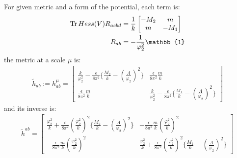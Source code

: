 For given metric and a form of the potential, each term is:
\begin{align}
    \Tr Hess(V) R_{acbd} &= \frac{1}{k} 
    \begin{bmatrix}
        -M_{2} & m \\
        m & -M_{1}
    \end{bmatrix} \\
    R_{ab} &= -\frac{1}{\varphi_{2} ^{2}} \mathbb{1}
\end{align}
the metric at a scale $\mu$ is:
\begin{align}
    \tilde h_{ab} := h_{ab} ^{\mu} = 
    \begin{bmatrix}
        \frac{k}{\varphi _{2} ^{2}} - \frac{\epsilon}{8\pi^{2}} \lbrace \frac{M_{2}}{k} - (\frac{\Lambda}{\varphi_{2}})^{2} \rbrace & \frac{\epsilon}{8\pi^{2}} \frac{m}{k} \\
        \frac{\epsilon}{8\pi^{2}} \frac{m}{k} & \frac{k}{\varphi _{2} ^{2}} - \frac{\epsilon}{8\pi^{2}} \lbrace \frac{M_{1}}{k} - (\frac{\Lambda}{\varphi_{2}})^{2} \rbrace
    \end{bmatrix}
\end{align}
and its inverse is:
\begin{align}
    \tilde h^{ab} = 
    \begin{bmatrix}
        \frac{\varphi_{2}^{2}}{k} + \frac{\epsilon}{8\pi^{2}}(\frac{\varphi_{2}^{2}}{k})^{2} \lbrace \frac{M_{2}}{k} - (\frac{\Lambda}{\varphi_{2}})^{2} \rbrace & -\frac{\epsilon}{8\pi^{2}} \frac{m}{k}(\frac{\varphi_{2}^{2}}{k})^{2} \\
        -\frac{\epsilon}{8\pi^{2}} \frac{m}{k}(\frac{\varphi_{2}^{2}}{k})^{2} & \frac{\varphi_{2}^{2}}{k} + \frac{\epsilon}{8\pi^{2}}(\frac{\varphi_{2}^{2}}{k})^{2} \lbrace \frac{M_{1}}{k} - (\frac{\Lambda}{\varphi_{2}})^{2} \rbrace
    \end{bmatrix}
\end{align}

